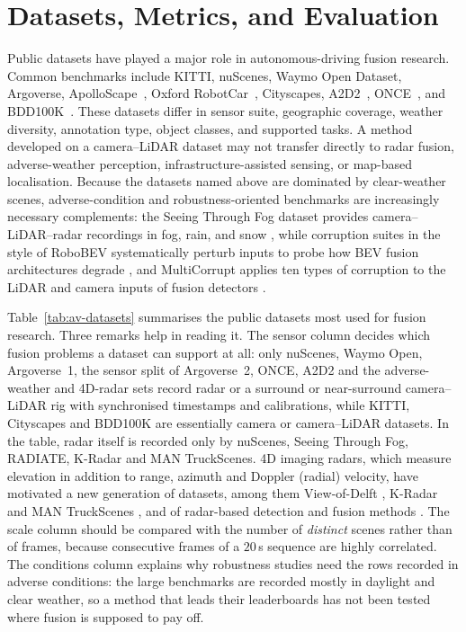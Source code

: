 \documentclass[graybox,envcountchap]{style/SNmono}
\begin{document}
\section{Datasets, Metrics, and Evaluation}

Public datasets have played a major role in autonomous-driving fusion research. Common benchmarks include KITTI, nuScenes, Waymo Open Dataset, Argoverse, ApolloScape~\cite{huang2020_apolloscape}, Oxford RobotCar~\cite{maddern2017_robotcar}, Cityscapes, A2D2~\cite{geyer2020_a2d2}, ONCE~\cite{mao2021_once}, and BDD100K~\cite{geiger2013_kitti,caesar2020_nuscenes,sun2020_waymo,chang2019_argoverse,cordts2016_cityscapes,yu2020_bdd100k}. These datasets differ in sensor suite, geographic coverage, weather diversity, annotation type, object classes, and supported tasks. A method developed on a camera--LiDAR dataset may not transfer directly to radar fusion, adverse-weather perception, infrastructure-assisted sensing, or map-based localisation. Because the datasets named above are dominated by clear-weather scenes, adverse-condition and robustness-oriented benchmarks are increasingly necessary complements: the Seeing Through Fog dataset provides camera--LiDAR--radar recordings in fog, rain, and snow \cite{bijelic2020_stf}, while corruption suites in the style of RoboBEV systematically perturb inputs to probe how BEV fusion architectures degrade \cite{dong2023_robobev}, and MultiCorrupt applies ten types of corruption to the LiDAR and camera inputs of fusion detectors \cite{beemelmanns2024_multicorrupt}.

Table~\ref{tab:av-datasets} summarises the public datasets most used for fusion research. Three remarks help in reading it. The sensor column decides which fusion problems a dataset can support at all: only nuScenes, Waymo Open, Argoverse~1, the sensor split of Argoverse~2, ONCE, A2D2 and the adverse-weather and 4D-radar sets record radar or a surround or near-surround camera--LiDAR rig with synchronised timestamps and calibrations, while KITTI, Cityscapes and BDD100K are essentially camera or camera--LiDAR datasets. In the table, radar itself is recorded only by nuScenes, Seeing Through Fog, RADIATE, K-Radar and MAN TruckScenes. 4D imaging radars, which measure elevation in addition to range, azimuth and Doppler (radial) velocity, have motivated a new generation of datasets, among them View-of-Delft \cite{palffy2022_vod}, K-Radar \cite{paek2022_kradar} and MAN TruckScenes \cite{fent2024_truckscenes}, and of radar-based detection and fusion methods \cite{fan2024_4dradar_survey}. The scale column should be compared with the number of \emph{distinct} scenes rather than of frames, because consecutive frames of a $20$\,s sequence are highly correlated. The conditions column explains why robustness studies need the rows recorded in adverse conditions: the large benchmarks are recorded mostly in daylight and clear weather, so a method that leads their leaderboards has not been tested where fusion is supposed to pay off.
\end{document}
